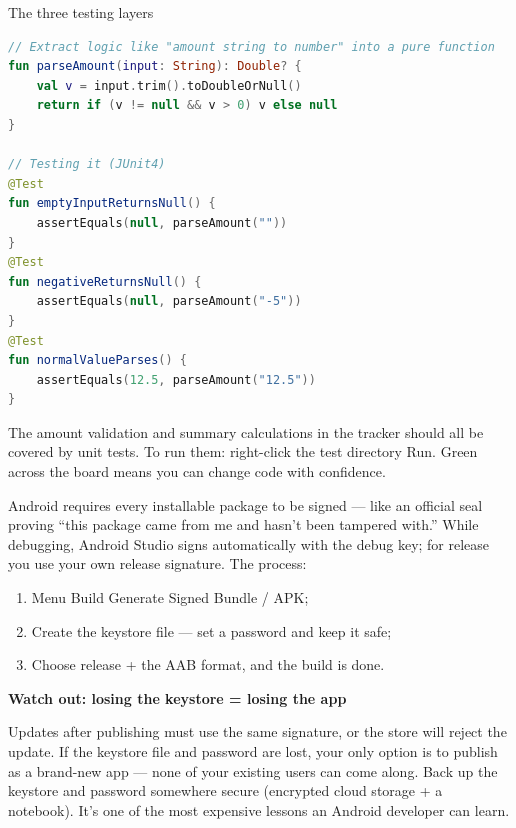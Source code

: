 \begin{center}\small\color{gray}The three testing layers\end{center}

\begin{lstlisting}[language=Kotlin]
// Extract logic like "amount string to number" into a pure function
fun parseAmount(input: String): Double? {
    val v = input.trim().toDoubleOrNull()
    return if (v != null && v > 0) v else null
}

// Testing it (JUnit4)
@Test
fun emptyInputReturnsNull() {
    assertEquals(null, parseAmount(""))
}
@Test
fun negativeReturnsNull() {
    assertEquals(null, parseAmount("-5"))
}
@Test
fun normalValueParses() {
    assertEquals(12.5, parseAmount("12.5"))
}
\end{lstlisting}

The amount validation and summary calculations in the tracker should all be covered by unit tests. To run them: right-click the test directory Run. Green across the board means you can change code with confidence.


Android requires every installable package to be signed — like an official seal proving “this package came from me and hasn't been tampered with.” While debugging, Android Studio signs automatically with the debug key; for release you use your own release signature. The process:

\begin{enumerate}
  \item Menu Build Generate Signed Bundle / APK;
  \item Create the keystore file — set a password and keep it safe;
  \item Choose release + the AAB format, and the build is done.
\end{enumerate}

\textbf{Watch out: losing the keystore = losing the app}\par

Updates after publishing must use the same signature, or the store will reject the update. If the keystore file and password are lost, your only option is to publish as a brand-new app — none of your existing users can come along. Back up the keystore and password somewhere secure (encrypted cloud storage + a notebook). It's one of the most expensive lessons an Android developer can learn.


